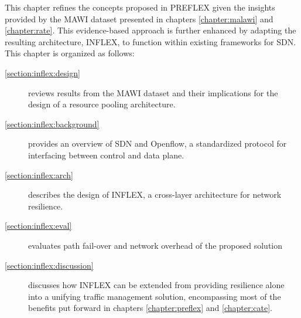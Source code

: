 This chapter refines the concepts proposed in \ac{PREFLEX} given the insights provided by the \ac{MAWI} dataset presented in chapters \ref{chapter:malawi} and \ref{chapter:rate}.
This evidence-based approach is further enhanced by adapting the resulting architecture, INFLEX, to function within existing frameworks for \ac{SDN}.
This chapter is organized as follows:

\renewcommand{\descriptionlabel}[1]{\hspace{\labelsep}\textbf{Section #1}}
\begin{description}
\item[\ref{section:inflex:design}] reviews results from the \ac{MAWI} dataset and their implications for the design of a resource pooling architecture.
\item[\ref{section:inflex:background}] provides an overview of \ac{SDN} and Openflow, a standardized protocol for interfacing between control and data plane.
\item[\ref{section:inflex:arch}] describes the design of INFLEX, a cross-layer architecture for network resilience.
\item[\ref{section:inflex:eval}] evaluates path fail-over and network overhead of the proposed solution
\item[\ref{section:inflex:discussion}] discusses how INFLEX can be extended from providing resilience alone into a unifying traffic management solution, encompassing most of the benefits put forward in chapters \ref{chapter:preflex} and \ref{chapter:cate}.
\end{description}


%

